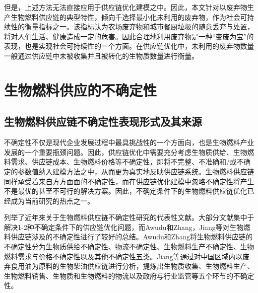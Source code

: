 但是，上述方法无法直接应用于供应链优化建模之中。因此，本文针对以废弃物生 产生物燃料供应链的典型特性，倾向千选择最小化未利用的废弃物，作为社会可持续性的衡量指标之一\cite{Balaman2014}。该指标认为农场废弃物和城市餐厨垃圾的随意丢弃与处置，将对人们生活、健康造成一定的危害。因此合理地利用废弃物是一种“变废为宝”的表现，也是实现社会可持续性的一个方面。在供应链优化中，未利用的废弃物数量一般通过供应链中未被收集并且被转化的生物质数量进行衡量。


\section{生物燃料供应的不确定性}
\subsection{生物燃料供应链不确定性表现形式及其来源}
不确定性不仅是现代企业发展过程中最具挑战性的一个方面向，也是生物燃料产业发展的一个重要瓶颈问题\cite{Kim2011}。因此，供应链优化中需要充分考虑生物质供给、生物燃料需求、供应链成本、生物燃料价格等不确定性，即将不完整、不准确和/或不确定的参数值纳入建模方法之中，从而更为真实地反映供应链系统\cite{Balaman2014}。生物燃料供应链同样承受着来自方方面面的不确定性，而在供应链优化建模中忽略不确定性将产生不是最优的甚至不可行的解决方案\cite{Shabani2014}。因此，不确定条件下的生物燃料供应链优化已经成为当前研究的热点之一。

列举了近年来关于生物燃料供应链不确定性研究的代表性文献。大部分文献集中于解决1-2种不确定条件下的供应链优化问题，而Awudu和Zhang\cite{Awudu2012}，Jiang等\cite{Jiang2014}对生物燃料供应链涉及的不确定性进行了较好的总结。Awudu和Zhang\cite{Awudu2012}将生物燃料供应链的不确定性分为生物质供给不确定性、物流不确定性、生物燃料生产不确定性、生物燃料需求与价格不确定性以及其他不确定性五类。Jiang等\cite{Jiang2014}通过对中国区域内以废弃食用油为原料的生物柴油供应链进行分析，提炼出生物质收集、生物燃料生产、生物燃料销售、生物质和生物燃料的物流以及政府与行业监管等五个环节的不确定性。

